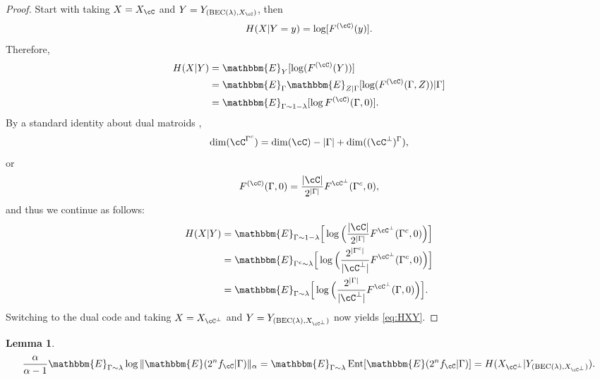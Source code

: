 \documentclass{amsart}
\newtheorem{lemma}[theorem]{Lemma}
\theoremstyle{remark}
\DeclareMathOperator{\Ent}{Ent}
\begin{document}
\begin{proof} Start with taking $X = X_{\cC}$ and $ Y = Y_{({\text{\rm BEC}}(\lambda), X_{\cC})}$, then
    \begin{align*}
        H(X|Y=y) = \log[F^{(\cC)}(y)].
    \end{align*}
Therefore,
    \begin{align*}
        H(X|Y) & = \mathbbm{E}_Y[\log(F^{(\cC)}(Y))]\\
        & = \mathbbm{E}_{\Gamma}\mathbbm{E}_{Z|\Gamma}[\log(F^{(\cC)}(\Gamma,Z))|\Gamma]\\
         & = \mathbbm{E}_{\Gamma\sim 1-\lambda}[\log F^{(\cC)}(\Gamma,0)].
         \end{align*}
By a standard identity about dual matroids \cite[p.72]{Oxley1992},
 $$
        \dim(\cC^{\Gamma^c}) = \dim(\cC) - |\Gamma| + \dim(({\cC^\bot})^{\Gamma}),
 $$
or
  $$
  F^{(\cC)}(\Gamma,0) = \frac{|\cC|}{2^{|\Gamma|}} F^{\cC^{\bot}}(\Gamma^{c},0),
  $$
and thus we continue as follows:  
        \begin{align*}
         H(X|Y) & =  \mathbbm{E}_{\Gamma\sim 1-\lambda}\Big[\log\Big(\frac{|\cC|}{2^{|\Gamma|}} F^{\cC^\bot}(\Gamma^c,0)\Big)\Big]\\
        & = \mathbbm{E}_{\Gamma^c\sim \lambda}\Big[\log\Big(\frac{2^{|\Gamma^c|}}{{|\cC^\bot|}} F^{\cC^\bot}(\Gamma^c,0)\Big)\Big] \\
        & = \mathbbm{E}_{\Gamma\sim \lambda}\Big[\log\Big(\frac{2^{|\Gamma|}}{{|\cC^\bot|}} F^{\cC^\bot}(\Gamma,0)\Big)\Big].
    \end{align*}
Switching to the dual code and taking $X = X_{\cC^{\bot}} $ and $ Y = Y_{({\text{\rm BEC}}(\lambda), X_{\cC^{\bot}})}$ now yields
\eqref{eq:HXY}.
\end{proof}

\begin{lemma}\label{lemma: MacW}
   \begin{align*}
    \frac{\alpha}{\alpha -1} \mathbbm{E}_{\Gamma\sim \lambda}\log\|\mathbbm{E}(2^nf_{\cC}|\Gamma)\|_\alpha  =  \mathbbm{E}_{\Gamma\sim \lambda} \Ent[\mathbbm{E}(2^nf_{\cC}|\Gamma)] 
    = H(X_{\cC^{\bot}}|Y_{({\text{\rm BEC}}(\lambda), X_{\cC^{\bot}})}). \qedhere
\end{align*}  
\end{lemma}
\end{document}
